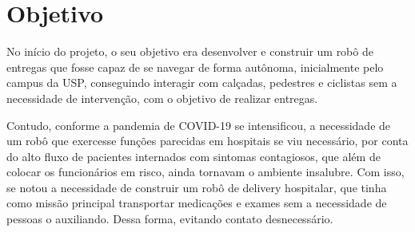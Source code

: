 \documentclass[../delivery_hospital_report.tex]{subfiles}
\begin{document}
\chapter{Objetivo}
No início do projeto, o seu objetivo era desenvolver e construir um robô de entregas que fosse capaz de se navegar de forma autônoma, inicialmente pelo campus da USP, conseguindo interagir com calçadas, pedestres e ciclistas sem a necessidade de intervenção, com o objetivo de realizar entregas. 

Contudo, conforme a pandemia de COVID-19 \cite{covid2020} se intensificou, a necessidade de um robô que exercesse funções parecidas em hospitais se viu necessário, por conta do alto fluxo de pacientes internados com sintomas contagiosos, que além de colocar os funcionários em risco, ainda tornavam o ambiente insalubre. Com isso, se notou a necessidade de construir um robô de delivery hospitalar, que tinha como missão principal transportar medicações e exames sem a necessidade de pessoas o auxiliando. Dessa forma, evitando contato desnecessário. 
\end{document}
